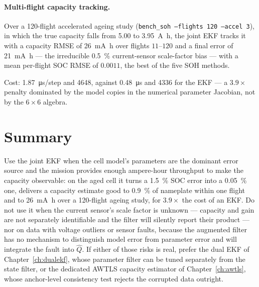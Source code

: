 \paragraph{Multi-flight capacity tracking.}  Over a 120-flight accelerated ageing study
(\texttt{bench\_soh --flights 120 --accel 3}), in which the true capacity falls from \SI{5.00}{} to
\SI{3.95}{\ampere\hour}, the joint EKF tracks it with a capacity RMSE of
\SI{26}{\milli\ampere\hour} over flights $11$--$120$ and a final error of
\SI{+21}{\milli\ampere\hour} --- the irreducible \SI{+0.5}{\percent} current-sensor scale-factor
bias --- with a mean per-flight SOC RMSE of $0.0011$, the best of the five SOH methods.

Cost: \SI{1.87}{\micro\second}/step and \SI{4648}{\byte}, against \SI{0.48}{\micro\second} and
\SI{4336}{\byte} for the EKF --- a $3.9\times$ penalty dominated by the model copies in the
numerical parameter Jacobian, not by the $6\times6$ algebra.

\section{Summary}
Use the joint EKF when the cell model's parameters are the dominant error source and the mission
provides enough ampere-hour throughput to make the capacity observable: on the aged cell it turns a
\SI{1.5}{\percent} SOC error into a \SI{0.05}{\percent} one, delivers a capacity estimate good to
\SI{0.9}{\percent} of nameplate within one flight and to \SI{26}{\milli\ampere\hour} over a
120-flight ageing study, for $3.9\times$ the cost of an EKF.  Do not
use it when the current sensor's scale factor is unknown --- capacity and gain are not separately
identifiable and the filter will silently report their product --- nor on data with voltage
outliers or sensor faults, because the augmented filter has no mechanism to distinguish model error
from parameter error and will integrate the fault into $\hat{Q}$.  If either of those risks is
real, prefer the dual EKF of Chapter~\ref{ch:dualekf}, whose parameter filter can be tuned
separately from the state filter, or the dedicated AWTLS capacity estimator of
Chapter~\ref{ch:awtls}, whose anchor-level consistency test rejects the corrupted data outright.
